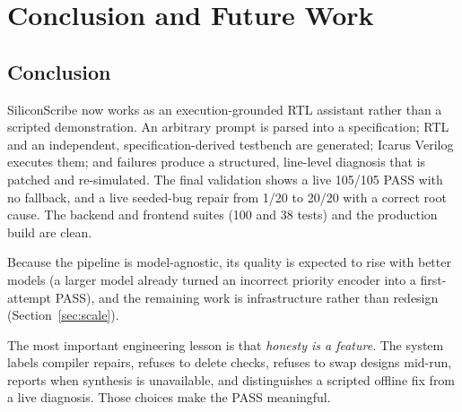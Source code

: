 \documentclass[11pt,a4paper]{article}
\begin{document}
\section{Conclusion and Future Work}
\label{sec:conclusion}

\subsection{Conclusion}
SiliconScribe now works as an execution-grounded RTL assistant rather than a
scripted demonstration. An arbitrary prompt is parsed into a specification; RTL and
an independent, specification-derived testbench are generated; Icarus Verilog
executes them; and failures produce a structured, line-level diagnosis that is
patched and re-simulated. The final validation shows a live 105/105 PASS with no
fallback, and a live seeded-bug repair from 1/20 to 20/20 with a correct root cause.
The backend and frontend suites (100 and 38 tests) and the production build are
clean.

Because the pipeline is model-agnostic, its quality is expected to rise with better models (a larger model already turned an incorrect priority encoder into a first-attempt PASS), and the remaining work is infrastructure rather than redesign (Section~\ref{sec:scale}).

The most important engineering lesson is that \emph{honesty is a feature}. The
system labels compiler repairs, refuses to delete checks, refuses to swap designs
mid-run, reports when synthesis is unavailable, and distinguishes a scripted offline
fix from a live diagnosis. Those choices make the PASS meaningful.
\end{document}

